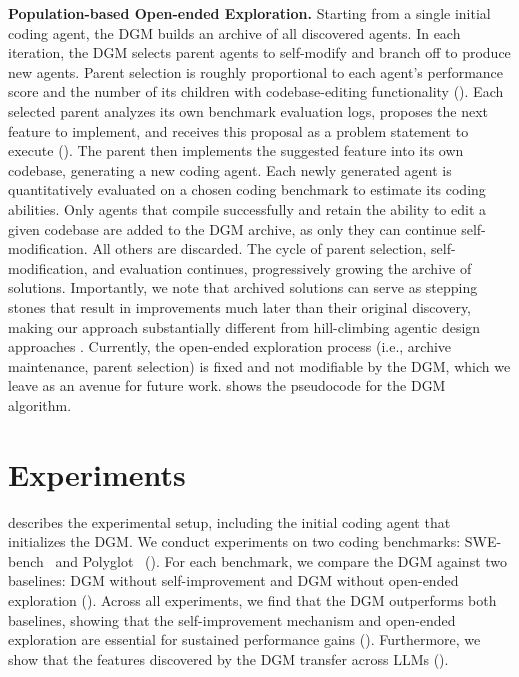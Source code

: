 \documentclass{article}
\begin{document}
\textbf{Population-based Open-ended Exploration.}
Starting from a single initial coding agent, the DGM builds an archive of all discovered agents. In each iteration, the DGM selects parent agents to self-modify and branch off to produce new agents. Parent selection is roughly proportional to each agent's performance score and the number of its children with codebase-editing functionality (). Each selected parent analyzes its own benchmark evaluation logs, proposes the next feature to implement, and receives this proposal as a problem statement to execute (). The parent then implements the suggested feature into its own codebase, generating a new coding agent. Each newly generated agent is quantitatively evaluated on a chosen coding benchmark to estimate its coding abilities. Only agents that compile successfully and retain the ability to edit a given codebase are added to the DGM archive, as only they can continue self-modification. All others are discarded. The cycle of parent selection, self-modification, and evaluation continues, progressively growing the archive of solutions. Importantly, we note that archived solutions can serve as stepping stones that result in improvements much later than their original discovery, making our approach substantially different from hill-climbing agentic design approaches \citep{robeyns2025self}. Currently, the open-ended exploration process (i.e., archive maintenance, parent selection) is fixed and not modifiable by the DGM, which we leave as an avenue for future work.  shows the pseudocode for the DGM algorithm.

\section{Experiments}
\label{sec:experiments}

 describes the experimental setup, including the initial coding agent that initializes the DGM. We conduct experiments on two coding benchmarks: SWE-bench~\citep{jimenez2024swebench} and Polyglot~\citep{gauthier2024polyglot} (). For each benchmark, we compare the DGM against two baselines: DGM without self-improvement and DGM without open-ended exploration (). Across all experiments, we find that the DGM outperforms both baselines, showing that the self-improvement mechanism and open-ended exploration are essential for sustained performance gains (). Furthermore, we show that the features discovered by the DGM transfer across LLMs ().
\end{document}
